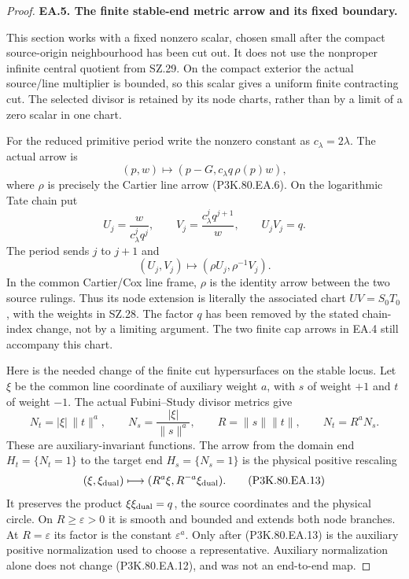\begin{proof}
\par\medskip\noindent\textbf{EA.5. The finite stable-end metric arrow and its fixed boundary.}\par\nopagebreak[4]

This section works with a fixed nonzero scalar, chosen small after the
compact source-origin neighbourhood has been cut out. It does not use the
nonproper infinite central quotient from SZ.29. On the compact exterior
the actual source/line multiplier is bounded, so this scalar gives a
uniform finite contracting cut. The selected divisor is retained by its
node charts, rather than by a limit of a zero scalar in one chart.

For the reduced primitive period write the nonzero constant as
\(c_\lambda=2\lambda\). The actual arrow is
\[
 (p,w)\longmapsto(p-G,c_\lambda q\,\rho(p)w),
\]
where \(\rho\) is precisely the Cartier line arrow (P3K.80.EA.6). On the
logarithmic Tate chain put
\[
 U_j=\frac{w}{c_\lambda^j q^j},\qquad
 V_j=\frac{c_\lambda^j q^{j+1}}w,
 \qquad U_jV_j=q.
\]
The period sends \(j\) to \(j+1\) and
\[
 (U_j,V_j)\longmapsto(\rho U_j,\rho^{-1}V_j).
 \tag{P3K.80.EA.11}
\]
In the common Cartier/Cox line frame, \(\rho\) is the identity
arrow between the two source rulings. Thus its node extension is
literally the associated chart \(UV=S_0T_0\), with the weights in
SZ.28. The factor \(q\) has been removed by the stated chain-index
change, not by a limiting argument. The two finite cap arrows in
EA.4 still accompany this chart.

Here is the needed change of the finite cut hypersurfaces on the stable
locus. Let \(\xi\) be the common line coordinate of auxiliary weight
\(a\), with \(s\) of weight \(+1\) and \(t\) of weight \(-1\).
The actual Fubini--Study divisor metrics give
\[
 N_t=|\xi|\,\|t\|^a,\qquad
 N_s=\frac{|\xi|}{\|s\|^a},\qquad
 R=\|s\|\|t\|,\qquad N_t=R^aN_s.
 \tag{P3K.80.EA.12}
\]
These are auxiliary-invariant functions. The arrow from the domain end
\(H_t=\{N_t=1\}\) to the target end \(H_s=\{N_s=1\}\) is the
physical positive rescaling
\[
 (\xi,\xi_{\rm dual})\longmapsto
 (R^a\xi,R^{-a}\xi_{\rm dual}).
 \tag{P3K.80.EA.13}
\]
It preserves the product \(\xi\xi_{\rm dual}=q\), the source
coordinates and the physical circle. On \(R\ge\varepsilon>0\)
it is smooth and bounded and extends both node branches. At
\(R=\varepsilon\) its factor is the constant
\(\varepsilon^a\). Only after (P3K.80.EA.13) is the auxiliary positive
normalization used to choose a representative. Auxiliary normalization
alone does not change (P3K.80.EA.12), and was not an end-to-end map.


\end{proof}
